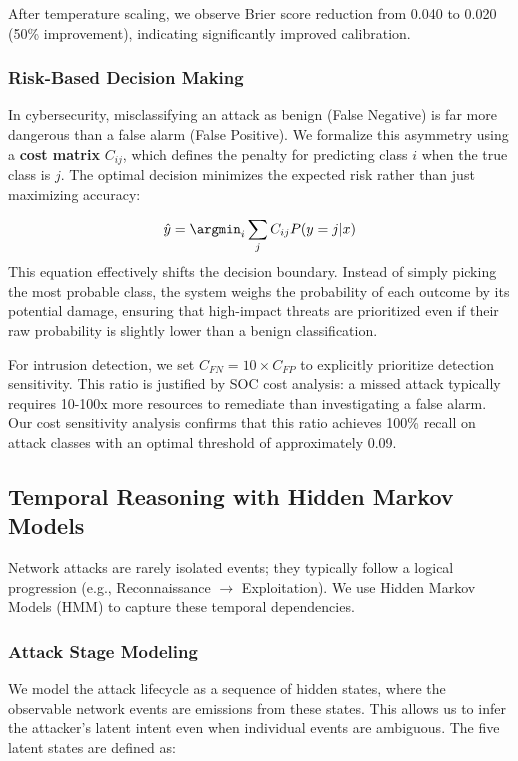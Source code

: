 \documentclass[conference]{IEEEtran}
\begin{document}
After temperature scaling, we observe Brier score reduction from 0.040 to 0.020 (50\% improvement), indicating significantly improved calibration.

\subsubsection{Risk-Based Decision Making}
In cybersecurity, misclassifying an attack as benign (False Negative) is far more dangerous than a false alarm (False Positive). We formalize this asymmetry using a \textbf{cost matrix} $C_{ij}$, which defines the penalty for predicting class $i$ when the true class is $j$. The optimal decision minimizes the expected risk rather than just maximizing accuracy:

\begin{equation}
\hat{y} = \argmin_i \sum_j C_{ij} P(y=j|x)
\end{equation}
This equation effectively shifts the decision boundary. Instead of simply picking the most probable class, the system weighs the probability of each outcome by its potential damage, ensuring that high-impact threats are prioritized even if their raw probability is slightly lower than a benign classification.

For intrusion detection, we set $C_{FN} = 10 \times C_{FP}$ to explicitly prioritize detection sensitivity. This ratio is justified by SOC cost analysis: a missed attack typically requires 10-100x more resources to remediate than investigating a false alarm. Our cost sensitivity analysis confirms that this ratio achieves 100\% recall on attack classes with an optimal threshold of approximately 0.09.

\subsection{Temporal Reasoning with Hidden Markov Models}
Network attacks are rarely isolated events; they typically follow a logical progression (e.g., Reconnaissance $\to$ Exploitation). We use Hidden Markov Models (HMM) to capture these temporal dependencies.

\subsubsection{Attack Stage Modeling}
We model the attack lifecycle as a sequence of hidden states, where the observable network events are emissions from these states. This allows us to infer the attacker's latent intent even when individual events are ambiguous.
The five latent states are defined as:
\end{document}
